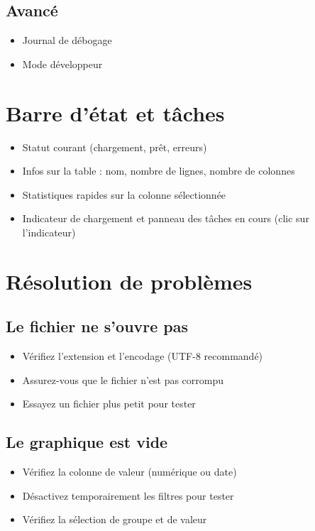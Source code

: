 \documentclass[11pt, a4paper]{article}
\begin{document}
\subsection{Avancé}
\begin{itemize}
    \item Journal de débogage
    \item Mode développeur
\end{itemize}

\section{Barre d'état et tâches}
\begin{itemize}
    \item Statut courant (chargement, prêt, erreurs)
    \item Infos sur la table : nom, nombre de lignes, nombre de colonnes
    \item Statistiques rapides sur la colonne sélectionnée
    \item Indicateur de chargement et panneau des tâches en cours (clic sur l'indicateur)
\end{itemize}

\section{Résolution de problèmes}

\subsection{Le fichier ne s'ouvre pas}
\begin{itemize}
    \item Vérifiez l'extension et l'encodage (UTF-8 recommandé)
    \item Assurez-vous que le fichier n'est pas corrompu
    \item Essayez un fichier plus petit pour tester
\end{itemize}

\subsection{Le graphique est vide}
\begin{itemize}
    \item Vérifiez la colonne de valeur (numérique ou date)
    \item Désactivez temporairement les filtres pour tester
    \item Vérifiez la sélection de groupe et de valeur
\end{itemize}
\end{document}
